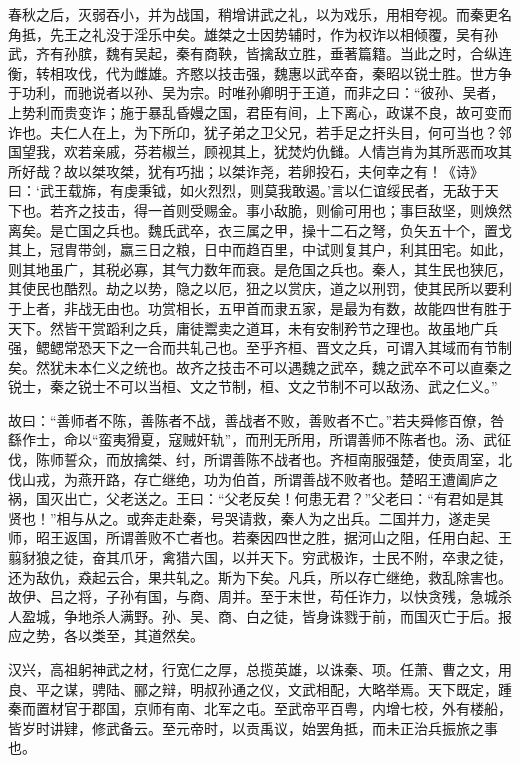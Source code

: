 \documentclass[12pt,UTF8]{ctexbook}
\begin{document}
春秋之后，灭弱吞小，并为战国，稍增讲武之礼，以为戏乐，用相夸视。而秦更名角抵，先王之礼没于淫乐中矣。雄桀之士因势辅时，作为权诈以相倾覆，吴有孙武，齐有孙膑，魏有吴起，秦有商鞅，皆擒敌立胜，垂著篇籍。当此之时，合纵连衡，转相攻伐，代为雌雄。齐愍以技击强，魏惠以武卒奋，秦昭以锐士胜。世方争于功利，而驰说者以孙、吴为宗。时唯孙卿明于王道，而非之曰：“彼孙、吴者，上势利而贵变诈；施于暴乱昏嫚之国，君臣有间，上下离心，政谋不良，故可变而诈也。夫仁人在上，为下所卬，犹子弟之卫父兄，若手足之扞头目，何可当也？邻国望我，欢若亲戚，芬若椒兰，顾视其上，犹焚灼仇雠。人情岂肯为其所恶而攻其所好哉？故以桀攻桀，犹有巧拙；以桀诈尧，若卵投石，夫何幸之有！《诗》曰：‘武王载旆，有虔秉钺，如火烈烈，则莫我敢遏。’言以仁谊绥民者，无敌于天下也。若齐之技击，得一首则受赐金。事小敌脆，则偷可用也；事巨敌坚，则焕然离矣。是亡国之兵也。魏氏武卒，衣三属之甲，操十二石之弩，负矢五十个，置戈其上，冠胄带剑，嬴三日之粮，日中而趋百里，中试则复其户，利其田宅。如此，则其地虽广，其税必寡，其气力数年而衰。是危国之兵也。秦人，其生民也狭厄，其使民也酷烈。劫之以势，隐之以厄，狃之以赏庆，道之以刑罚，使其民所以要利于上者，非战无由也。功赏相长，五甲首而隶五家，是最为有数，故能四世有胜于天下。然皆干赏蹈利之兵，庸徒鬻卖之道耳，未有安制矜节之理也。故虽地广兵强，鳃鳃常恐天下之一合而共轧己也。至乎齐桓、晋文之兵，可谓入其域而有节制矣。然犹未本仁义之统也。故齐之技击不可以遇魏之武卒，魏之武卒不可以直秦之锐士，秦之锐士不可以当桓、文之节制，桓、文之节制不可以敌汤、武之仁义。”



故曰：“善师者不陈，善陈者不战，善战者不败，善败者不亡。”若夫舜修百僚，咎繇作士，命以“蛮夷猾夏，寇贼奸轨”，而刑无所用，所谓善师不陈者也。汤、武征伐，陈师誓众，而放擒桀、纣，所谓善陈不战者也。齐桓南服强楚，使贡周室，北伐山戎，为燕开路，存亡继绝，功为伯首，所谓善战不败者也。楚昭王遭阖庐之祸，国灭出亡，父老送之。王曰：“父老反矣！何患无君？”父老曰：“有君如是其贤也！”相与从之。或奔走赴秦，号哭请救，秦人为之出兵。二国并力，遂走吴师，昭王返国，所谓善败不亡者也。若秦因四世之胜，据河山之阻，任用白起、王翦豺狼之徒，奋其爪牙，禽猎六国，以并天下。穷武极诈，士民不附，卒隶之徒，还为敌仇，猋起云合，果共轧之。斯为下矣。凡兵，所以存亡继绝，救乱除害也。故伊、吕之将，子孙有国，与商、周并。至于末世，苟任诈力，以快贪残，急城杀人盈城，争地杀人满野。孙、吴、商、白之徒，皆身诛戮于前，而国灭亡于后。报应之势，各以类至，其道然矣。



汉兴，高祖躬神武之材，行宽仁之厚，总揽英雄，以诛秦、项。任萧、曹之文，用良、平之谋，骋陆、郦之辩，明叔孙通之仪，文武相配，大略举焉。天下既定，踵秦而置材官于郡国，京师有南、北军之屯。至武帝平百粤，内增七校，外有楼船，皆岁时讲肄，修武备云。至元帝时，以贡禹议，始罢角抵，而未正治兵振旅之事也。
\end{document}
